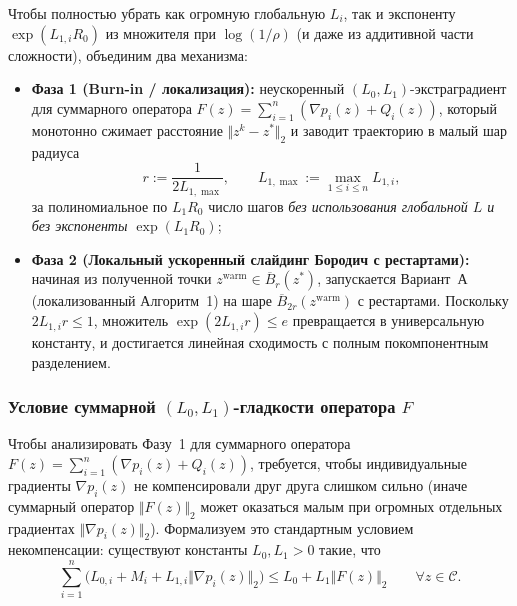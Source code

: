 \documentclass[11pt, a4paper]{article}
\theoremstyle{definition}
\begin{document}
Чтобы полностью убрать как огромную глобальную $L_i$, так и экспоненту $\exp(L_{1,i} R_0)$ из множителя при $\log(1/\rho)$ (и даже из аддитивной части сложности), объединим два механизма:
\begin{itemize}
    \item \textbf{Фаза 1 (Burn-in / локализация):} неускоренный $(L_0, L_1)$-экстраградиент для суммарного оператора $F(z) = \sum_{i=1}^n (\nabla p_i(z) + Q_i(z))$, который монотонно сжимает расстояние $\Vert z^k - z^* \Vert_2$ и заводит траекторию в малый шар радиуса
    \[
    r := \frac{1}{2 L_{1,\max}}, \qquad L_{1,\max} := \max_{1 \le i \le n} L_{1,i},
    \]
    за полиномиальное по $L_1 R_0$ число шагов \emph{без использования глобальной $L$ и без экспоненты $\exp(L_1 R_0)$};
    \item \textbf{Фаза 2 (Локальный ускоренный слайдинг Бородич с рестартами):} начиная из полученной точки $z^{\mathrm{warm}} \in \overline{B}_r(z^*)$, запускается Вариант~А (локализованный Алгоритм~1) на шаре $\overline{B}_{2r}(z^{\mathrm{warm}})$ с рестартами. Поскольку $2 L_{1,i} r \le 1$, множитель $\exp(2 L_{1,i} r) \le e$ превращается в универсальную константу, и достигается линейная сходимость с полным покомпонентным разделением.
\end{itemize}

\subsubsection{Условие суммарной $(L_0, L_1)$-гладкости оператора $F$}

Чтобы анализировать Фазу~1 для суммарного оператора $F(z) = \sum_{i=1}^n (\nabla p_i(z) + Q_i(z))$, требуется, чтобы индивидуальные градиенты $\nabla p_i(z)$ не компенсировали друг друга слишком сильно (иначе суммарный оператор $\Vert F(z) \Vert_2$ может оказаться малым при огромных отдельных градиентах $\Vert \nabla p_i(z) \Vert_2$). Формализуем это стандартным условием некомпенсации: существуют константы $L_0, L_1 > 0$ такие, что
\begin{equation}\label{eq:sum_l0l1_condition}
\sum_{i=1}^n \big(L_{0,i} + M_i + L_{1,i} \Vert \nabla p_i(z) \Vert_2\big) \le L_0 + L_1 \Vert F(z) \Vert_2 \qquad \forall z \in \mathcal{C}.
\end{equation}
\end{document}
